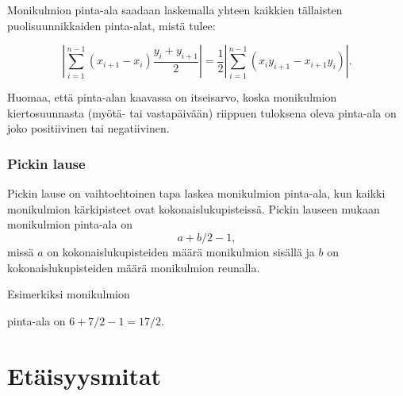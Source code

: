 Monikulmion pinta-ala saadaan laskemalla yhteen kaikkien
tällaisten puolisuunnikkaiden pinta-alat, mistä tulee:

\[|\sum_{i=1}^{n-1} (x_{i+1}-x_{i}) \frac{y_i+y_{i+1}}{2}| =
\frac{1}{2} |\sum_{i=1}^{n-1} (x_i y_{i+1} - x_{i+1} y_i)|.\]

Huomaa, että pinta-alan kaavassa on itseisarvo,
koska monikulmion kiertosuunnasta (myötä- tai vastapäivään)
riippuen tuloksena oleva pinta-ala on joko
positiivinen tai negatiivinen.

\subsubsection{Pickin lause}


Pickin lause on vaihtoehtoinen tapa laskea
monikulmion pinta-ala,
kun kaikki monikulmion kärkipisteet
ovat kokonaislukupisteissä.
Pickin lauseen mukaan monikulmion pinta-ala on
\[ a + b/2 -1,\]
missä $a$ on kokonaislukupisteiden määrä monikulmion sisällä
ja $b$ on kokonaislukupisteiden määrä monikulmion reunalla.

Esimerkiksi monikulmion
\begin{center}
\end{center}

pinta-ala on $6+7/2-1=17/2$.

\section{Etäisyysmitat}

